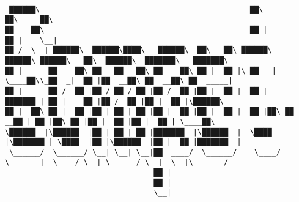\documentclass[varwidth=\maxdimen,margin=0.5cm,multi={verbatim}]{standalone}
\begin{document}
\begin{verbatim}




 ██████\                                                ██\                ██\     ██\
██  __██\                                               ██ |               ██ |    \__|
██ /  \__| ██████\  ██████\████\   ██████\  ██\   ██\ ██████\    ██████\ ██████\   ██\  ██████\  ███████\   ███████\
██ |      ██  __██\ ██  _██  _██\ ██  __██\ ██ |  ██ |\_██  _|   \____██\\_██  _|  ██ |██  __██\ ██  __██\ ██  _____|
██ |      ██ /  ██ |██ / ██ / ██ |██ /  ██ |██ |  ██ |  ██ |     ███████ | ██ |    ██ |██ /  ██ |██ |  ██ |\██████\
██ |  ██\ ██ |  ██ |██ | ██ | ██ |██ |  ██ |██ |  ██ |  ██ |██\ ██  __██ | ██ |██\ ██ |██ |  ██ |██ |  ██ | \____██\
\██████  |\██████  |██ | ██ | ██ |███████  |\██████  |  \████  |\███████ | \████  |██ |\██████  |██ |  ██ |███████  |
 \______/  \______/ \__| \__| \__|██  ____/  \______/    \____/  \_______|  \____/ \__| \______/ \__|  \__|\_______/
                                  ██ |
                                  ██ |
                                  \__|



\end{verbatim}
\end{document}
